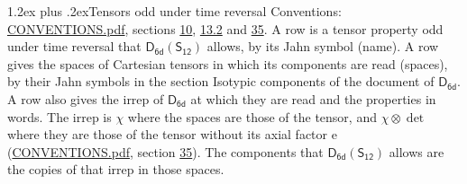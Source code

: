 \documentclass[10pt,a4paper]{article}
\makeatletter
\renewcommand\section{\@startsection{section}{1}{\z@}{-3ex plus -1ex minus -.2ex}%
  {1.2ex plus .2ex}{\normalfont\large\sffamily\bfseries\color{parttitle}}}
\numberwithin{equation}{section}
\newcommand{\grp}[1]{\mathsf{#1}}
\newcommand{\irrprod}{\otimes}
\makeatother
\begin{document}
\section{Tensors odd under time reversal}\label{s:time_odd}
Conventions: \href{../../CONVENTIONS.pdf}{CONVENTIONS.pdf}, sections \href{../../../rotation/CONVENTIONS.pdf\#conv.10}{10}, \href{../../../rotation/CONVENTIONS.pdf\#conv.13.2}{13.2} and \href{../../CONVENTIONS.pdf\#conv.35}{35}.
\leavevmode\label{n:head.name.property}A row is a tensor property odd under time reversal that $\grp{D_{6d}}(\grp{S_{12}})$ allows, by its Jahn symbol (name). \label{n:head.spaces}A row gives the spaces of Cartesian tensors in which its components are read (spaces), by their Jahn symbols in the section Isotypic components of the document of \href{../../../rotation/data/pdf/D6d.pdf}{$\grp{D_{6d}}$}. \label{n:head.properties}A row also gives the irrep of $\grp{D_{6d}}$ at which they are read and the properties in words. The irrep is $\chi$ where the spaces are those of the tensor, and $\chi \irrprod \det$ where they are those of the tensor without its axial factor e (\href{../../CONVENTIONS.pdf}{CONVENTIONS.pdf}, section \href{../../CONVENTIONS.pdf\#conv.35}{35}). The components that $\grp{D_{6d}}(\grp{S_{12}})$ allows are the copies of that irrep in those spaces.
\end{document}
